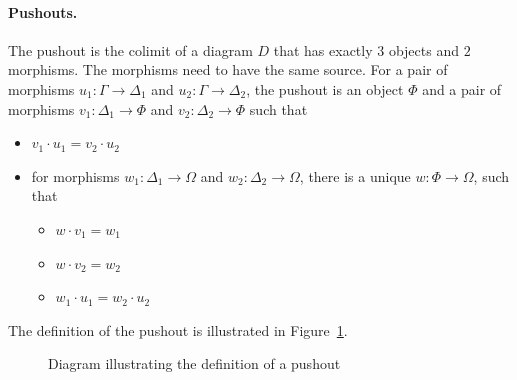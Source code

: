 \paragraph{Pushouts.}
The pushout is the colimit of a diagram $D$ that has exactly $3$ objects and $2$ morphisms. The morphisms need to have the same source. For a pair of morphisms $u_1 : \Gamma \to \Delta_1$ and $u_2 : \Gamma \to \Delta_2$, the pushout is an object $\Phi$ and a pair of morphisms $v_1 : \Delta_1 \to \Phi$ and $v_2 : \Delta_2 \to \Phi$ such that 
\begin{itemize}
\item $v_1 \cdot u_1 = v_2 \cdot u_2 $
\item for morphisms $w_1 : \Delta_1 \to \Omega$ and $w_2 : \Delta_2 \to \Omega$, there is a unique $w : \Phi \to \Omega$, such that 
\begin{itemize}
\item $w \cdot v_1 = w_1$
\item $w \cdot v_2 = w_2$
\item $w_1 \cdot u_1 = w_2 \cdot u_2$ 
\end{itemize}

\end{itemize}
The definition of the pushout is illustrated in Figure~\ref{fig:pushoutDef}. 
\begin{figure}
\caption{Diagram illustrating the definition of a pushout}
\label{fig:pushoutDef}
\end{figure}

